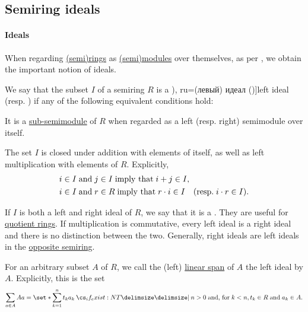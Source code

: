 \subsection{Semiring ideals}\label{subsec:semiring_ideals}

\paragraph{Ideals}

When regarding \hyperref[def:semiring]{(semi)rings} as \hyperref[def:semimodule]{(semi)modules} over themselves, as per , we obtain the important notion of ideals.

\begin{definition}\label{def:semiring_ideal}\mimprovised
  We say that the subset \( I \) of a semiring \( R \) is a \term[bg=(ляв) идеал (\cite[3]{КоцевСидеров2016}), ru=(левый) идеал (\cite[def. 1.1.3]{ВечтомовПетров2022})]{left ideal} (resp. ) if any of the following equivalent conditions hold:
  \begin{thmenum}[series=def:semiring_ideal]
     It is a \hyperref[def:semimodule/submodel]{sub-semimodule} of \( R \) when regarded as a left (resp. right) semimodule over itself.

     The set \( I \) is closed under addition with elements of itself, as well as left multiplication with elements of \( R \). Explicitly,
    \begin{align}
      &i \in I \T{and} j \in I \T{imply that} i + j \in I, \\
      &i \in I \T{and} r \in R \T{imply that} r \cdot i \in I \quad (\T{resp.} i \cdot r \in I).
    \end{align}
  \end{thmenum}

  If \( I \) is both a left and right ideal of \( R \), we say that it is a . They are useful for \hyperref[def:ring/quotient]{quotient rings}. If multiplication is commutative, every left ideal is a right ideal and there is no distinction between the two. Generally, right ideals are left ideals in the \hyperref[def:semiring/opposite]{opposite semiring}.

  \begin{thmenum}[resume=def:semiring_ideal]
     For an arbitrary subset \( A \) of \( R \), we call the (left) \hyperref[def:semimodule/submodel]{linear span} of \( A \) the left ideal  by \( A \). Explicitly, this is the set
    \begin{equation*}
      \sum_{a \in A} A a = \set*{ \sum_{k=1}^n t_k a_k \given* n > 0 \T{and, for} k < n, t_k \in R \T{and} a_k \in A }.
    \end{equation*}


\end{thmenum}
\end{definition}
